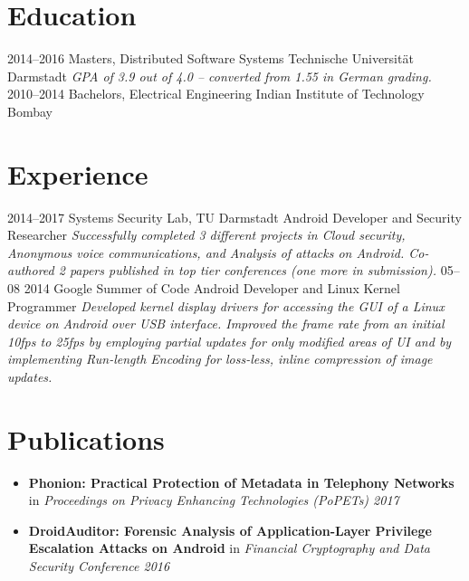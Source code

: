 \documentclass[]{friggeri-cv}
\begin{document}
\section{Education}
\begin{entrylist}
  \entry
    {2014–2016}
    {Masters, {\normalfont Distributed Software Systems}}
    {Technische Universität Darmstadt}
    {\emph{GPA of 3.9 out of 4.0 -- converted from 1.55 in German grading.}}
  \entry
    {2010–2014}
    {Bachelors, {\normalfont Electrical Engineering}}
    {Indian Institute of Technology Bombay}
    {}%
\end{entrylist}

\section{Experience}
\begin{entrylist}
  \entry
    {2014–2017}
    {Systems Security Lab, TU Darmstadt}
    {Android Developer and Security Researcher}
    {\emph{Successfully completed 3 different projects in Cloud security, Anonymous voice communications, and Analysis of attacks on Android. Co-authored 2 papers published in top tier conferences (one more in submission).}}
  \entry
    {05–08 2014}
    {Google Summer of Code}
    {Android Developer and Linux Kernel Programmer}
    {\emph{Developed kernel display drivers for accessing the GUI of a Linux device on Android over USB interface. Improved the frame rate from an initial 10fps to 25fps by employing partial updates for only modified areas of UI and by implementing Run-length Encoding for loss-less, inline compression of image updates.}}
\end{entrylist}

\section{Publications}
\begin{itemize}
  \item \textbf{Phonion: Practical Protection of Metadata in Telephony Networks} in \textit{Proceedings on Privacy Enhancing Technologies (PoPETs) 2017}
  \item \textbf{DroidAuditor: Forensic Analysis of Application-Layer Privilege Escalation Attacks on Android} in \textit{Financial Cryptography and Data Security Conference 2016}
\end{itemize}
\vspace{0.3cm}
\end{document}
